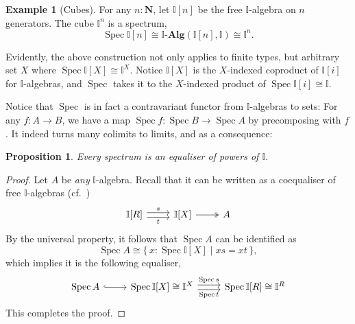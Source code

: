 \documentclass[12pt]{amsart}
\newtheorem{proposition}[theorem]{Proposition}
\theoremstyle{definition}
\newtheorem{example}[theorem]{Example}
\newcommand{\mb}[1]{\mathbf{#1}}
\newcommand{\mbb}[1]{\mathbb{#1}}
\newcommand{\I}{\mbb I}
\newcommand{\alg}{\text{-}\mb{Alg}}
\newcommand{\scomp}[2]{\{\,#1\mid#2\,\}}
\newcommand{\N}{\mb N}
\newcommand{\spec}{\operatorname{Spec}}
\begin{document}
\begin{example}[Cubes]\label{exm:cubeaffine}
  For any $n:\N$, let $\I[n]$ be the free $\I$-algebra on $n$ generators. The cube $\I^n$ is a spectrum,
  \[ \spec \I[n] \cong \I\alg(\I[n],\I) \cong \I^n. \]
\end{example}

Evidently, the above construction not only applies to finite types, but arbitrary set $X$ where $\spec \I[X] \cong \I^X$. Notice $\I[X]$ is the $X$-indexed coproduct of $\I[i]$ for $\I$-algebras, and $\spec$ takes it to the $X$-indexed product of $\spec\I[i] \cong \I$. 

Notice that $\spec$ is in fact a contravariant functor from $\I$-algebras to sets: For any $f \colon A \to B$, we have a map $\spec f \colon \spec B \to \spec A$ by precomposing with $f$. It indeed turns many colimits to limits, and as a consequence:

\begin{proposition}
  Every spectrum is an equaliser of powers of $\I$. 
\end{proposition}
\begin{proof}
  Let $A$ be \emph{any} $\I$-algebra. Recall that it can be written as a coequaliser of free $\I$-algebras (cf.~\citet[Prop. 3.8.9]{borceux1994handbook2})
  \[
  \begin{tikzcd}
    \I[R] \ar[r, shift left, "s"] \ar[r, shift right, "t"'] & \I[X] \ar[r, two heads] & A
  \end{tikzcd}
  \]
  By the universal property, it follows that $\spec A$ can be identified as
  \[ \spec A \cong \scomp{x : \spec\I[X]}{xs = xt}, \]
  which implies it is the following equaliser,
  \[
  \begin{tikzcd}
    \spec A \ar[r, hook] & \spec\I[X] \cong \I^X \ar[r, shift left, "\spec s"] \ar[r, shift right, "\spec t"'] & \spec\I[R]\cong\I^R
  \end{tikzcd}
  \]
  This completes the proof.
\end{proof}
\end{document}
